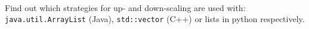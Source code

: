  \\
Find out which strategies for up- and down-scaling are used with:
\texttt{java.util.ArrayList} (Java), \texttt{std::vector} (C++) or lists in
python respectively.